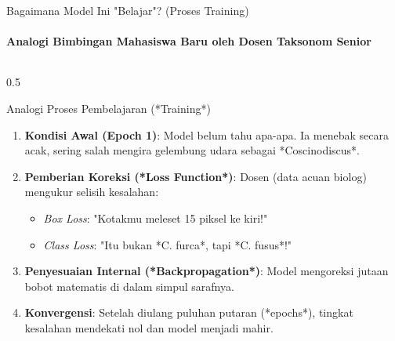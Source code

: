 \documentclass[aspectratio=169, 10pt]{beamer}
\begin{document}
\begin{frame}{Bagaimana Model Ini "Belajar"? (Proses Training)}
    \framesubtitle{Analogi Bimbingan Mahasiswa Baru oleh Dosen Taksonom Senior}
    
    \begin{columns}[T]
        \begin{column}{0.5\textwidth}
            \begin{conceptcard}{Analogi Proses Pembelajaran (*Training*)}
                \scriptsize
                \begin{enumerate}\setlength\itemsep{3pt}
                    \item \textbf{Kondisi Awal (Epoch 1)}: Model belum tahu apa-apa. Ia menebak secara acak, sering salah mengira gelembung udara sebagai *Coscinodiscus*.
                    \item \textbf{Pemberian Koreksi (*Loss Function*)}: Dosen (data acuan biolog) mengukur selisih kesalahan:
                        \begin{itemize}\scriptsize
                            \item \textit{Box Loss}: "Kotakmu meleset 15 piksel ke kiri!"
                            \item \textit{Class Loss}: "Itu bukan *C. furca*, tapi *C. fusus*!"
                        \end{itemize}
                    \item \textbf{Penyesuaian Internal (*Backpropagation*)}: Model mengoreksi jutaan bobot matematis di dalam simpul sarafnya.
                    \item \textbf{Konvergensi}: Setelah diulang puluhan putaran (*epochs*), tingkat kesalahan mendekati nol dan model menjadi mahir.
                \end{enumerate}
            \end{conceptcard}
        \end{column}
        

\end{columns}
\end{frame}
\end{document}

